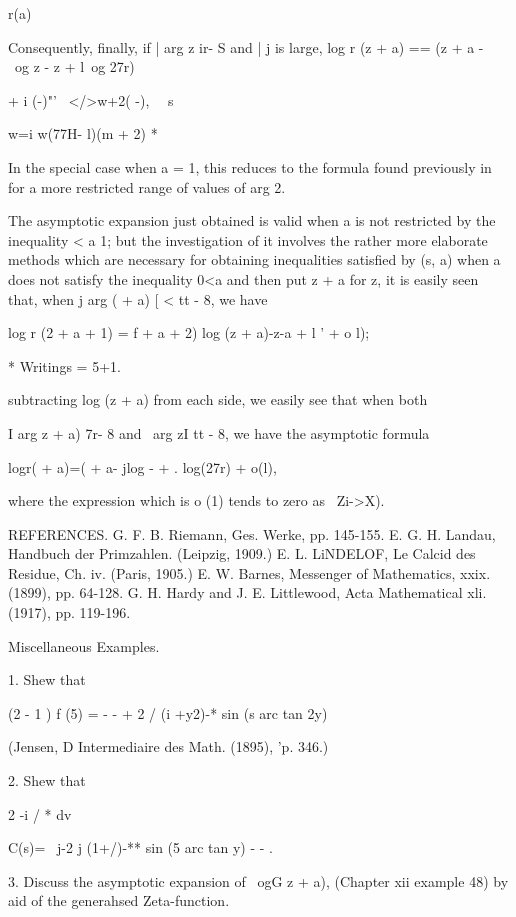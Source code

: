{{r(a)

Consequently, finally, if | arg z ir- S and | j is large, log r (z +
a) == (z + a -~ \ og z - z + l\ og 27r)

+ i (-)"'~ </>w+2( -), \ \ s

w=i w(77H- l)(m + 2) *

In the special case when a = 1, this reduces to the formula found
previously in  for a more restricted range of values of arg 2.

The asymptotic expansion just obtained is valid when a is not
restricted by the inequality < a 1; but the investigation of it
involves the rather more elaborate methods which are necessary for
obtaining inequalities satisfied by (s, a) when a does not satisfy the
inequality 0<a%
and then put z + a for z, it is easily seen that, when j arg ( + a) [
< tt - 8, we have

log r (2 + a + 1) = f + a + 2) log (z + a)-z-a + l ' + o l);

* Writings = 5+1.

%
%

subtracting log (z + a) from each side, we easily see that when both

I arg z + a) 7r- 8 and \ arg zI tt - 8, we have the asymptotic formula

logr( + a)=( + a- jlog - + . log(27r) + o(l),

where the expression which is o (1) tends to zero as \ Zi->X).

REFERENCES. G. F. B. Riemann, Ges. Werke, pp. 145-155. E. G. H.
Landau, Handbuch der Primzahlen. (Leipzig, 1909.) E. L. LiNDELOF, Le
Calcid des Residue, Ch. iv. (Paris, 1905.) E. W. Barnes, Messenger of
Mathematics, xxix. (1899), pp. 64-128. G. H. Hardy and J. E.
Littlewood, Acta Mathematical xli. (1917), pp. 119-196.

Miscellaneous Examples.

1. Shew that

(2 - 1 ) f (5) = - - + 2 / (i +y2)-* sin (s arc tan 2y)

(Jensen, D Intermediaire des Math. (1895), 'p. 346.)

2. Shew that

2 -i / * dv

C(s)= \ j-2 j (1+/)-** sin (5 arc tan y) - - .


3. Discuss the asymptotic expansion of \ ogG z + a), (Chapter xii
example 48) by aid of the generahsed Zeta-function. 

}}
